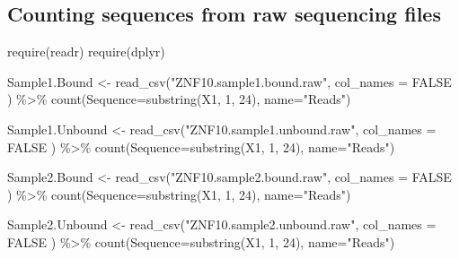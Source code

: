 \documentclass[
]{article}
\newenvironment{Shaded}{\begin{snugshade}}{\end{snugshade}}
\newcommand{\AttributeTok}[1]{\textcolor[rgb]{0.77,0.63,0.00}{#1}}
\newcommand{\ConstantTok}[1]{\textcolor[rgb]{0.00,0.00,0.00}{#1}}
\newcommand{\DecValTok}[1]{\textcolor[rgb]{0.00,0.00,0.81}{#1}}
\newcommand{\FunctionTok}[1]{\textcolor[rgb]{0.00,0.00,0.00}{#1}}
\newcommand{\NormalTok}[1]{#1}
\newcommand{\OtherTok}[1]{\textcolor[rgb]{0.56,0.35,0.01}{#1}}
\newcommand{\SpecialCharTok}[1]{\textcolor[rgb]{0.00,0.00,0.00}{#1}}
\newcommand{\StringTok}[1]{\textcolor[rgb]{0.31,0.60,0.02}{#1}}
\begin{document}
\hypertarget{counting-sequences-from-raw-sequencing-files}{%
\subsection{Counting sequences from raw sequencing
files}\label{counting-sequences-from-raw-sequencing-files}}

\begin{Shaded}
\begin{Highlighting}[]
\FunctionTok{require}\NormalTok{(readr)}
\FunctionTok{require}\NormalTok{(dplyr)}

\NormalTok{Sample1.Bound }\OtherTok{\textless{}{-}} \FunctionTok{read\_csv}\NormalTok{(}\StringTok{"ZNF10.sample1.bound.raw"}\NormalTok{,}
  \AttributeTok{col\_names =} \ConstantTok{FALSE}
\NormalTok{) }\SpecialCharTok{\%\textgreater{}\%}
  \FunctionTok{count}\NormalTok{(}\AttributeTok{Sequence=}\FunctionTok{substring}\NormalTok{(X1, }\DecValTok{1}\NormalTok{, }\DecValTok{24}\NormalTok{), }\AttributeTok{name=}\StringTok{"Reads"}\NormalTok{)}

\NormalTok{Sample1.Unbound }\OtherTok{\textless{}{-}} \FunctionTok{read\_csv}\NormalTok{(}\StringTok{"ZNF10.sample1.unbound.raw"}\NormalTok{,}
  \AttributeTok{col\_names =} \ConstantTok{FALSE}
\NormalTok{) }\SpecialCharTok{\%\textgreater{}\%}
  \FunctionTok{count}\NormalTok{(}\AttributeTok{Sequence=}\FunctionTok{substring}\NormalTok{(X1, }\DecValTok{1}\NormalTok{, }\DecValTok{24}\NormalTok{), }\AttributeTok{name=}\StringTok{"Reads"}\NormalTok{)}

\NormalTok{Sample2.Bound }\OtherTok{\textless{}{-}} \FunctionTok{read\_csv}\NormalTok{(}\StringTok{"ZNF10.sample2.bound.raw"}\NormalTok{,}
  \AttributeTok{col\_names =} \ConstantTok{FALSE}
\NormalTok{) }\SpecialCharTok{\%\textgreater{}\%}
  \FunctionTok{count}\NormalTok{(}\AttributeTok{Sequence=}\FunctionTok{substring}\NormalTok{(X1, }\DecValTok{1}\NormalTok{, }\DecValTok{24}\NormalTok{), }\AttributeTok{name=}\StringTok{"Reads"}\NormalTok{)}

\NormalTok{Sample2.Unbound }\OtherTok{\textless{}{-}} \FunctionTok{read\_csv}\NormalTok{(}\StringTok{"ZNF10.sample2.unbound.raw"}\NormalTok{,}
  \AttributeTok{col\_names =} \ConstantTok{FALSE}
\NormalTok{) }\SpecialCharTok{\%\textgreater{}\%}
  \FunctionTok{count}\NormalTok{(}\AttributeTok{Sequence=}\FunctionTok{substring}\NormalTok{(X1, }\DecValTok{1}\NormalTok{, }\DecValTok{24}\NormalTok{), }\AttributeTok{name=}\StringTok{"Reads"}\NormalTok{)}
\end{Highlighting}
\end{Shaded}
\end{document}
